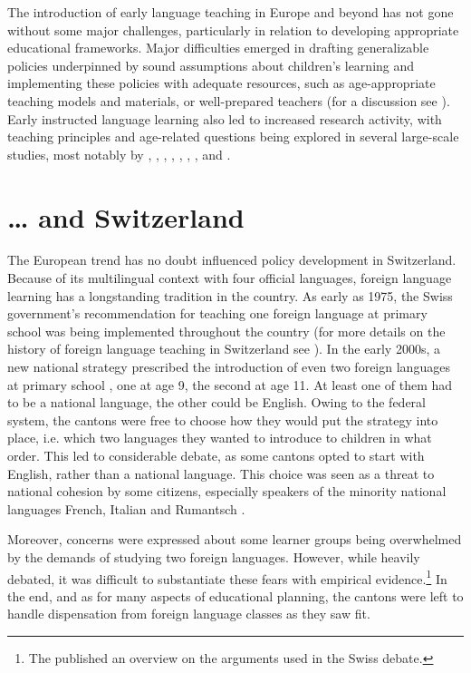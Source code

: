\documentclass[output=paper]{langsci/langscibook}
\begin{document}
The introduction of early language teaching in Europe and beyond has not gone without some major challenges, particularly in relation to developing appropriate educational frameworks. Major difficulties emerged in drafting generalizable policies underpinned by sound assumptions about children’s learning \citep{Johnstone2009} and implementing these policies with adequate resources, such as age-appropriate teaching models and materials, or well-prepared teachers (for a discussion see \citealt{GartonEtAl2011}). Early instructed language learning also led to increased research activity, with teaching principles and age-related questions being explored in several large-scale studies, most notably by \citet{EdelenbosEtAl2006}, \citet{Muñoz2006}, \citet{NikolovCsapó2010}, \citet{Enever2011}, \citet{GartonEtAl2011}, \citet{Pfenninger2016}, \citet{JaekelEtAl2017}, and \citet{BaumertEtAl2020}.

\section{… and Switzerland}

The European trend has no doubt influenced policy development in Switzerland. Because of its multilingual context with four official languages, foreign language learning has a longstanding tradition in the country. As early as 1975, the Swiss government’s recommendation for teaching one foreign language at primary school was being implemented throughout the country (for more details on the history of foreign language teaching in Switzerland see \citealt{GiudiciGrizelj2016}). In the early 2000s, a new national strategy prescribed the introduction of even two foreign languages at primary school \citep{EDK2004}, one at age 9, the second at age 11. At least one of them had to be a national language, the other could be English. Owing to the federal system, the cantons were free to choose how they would put the strategy into place, i.e. which two languages they wanted to introduce to children in what order. This led to considerable debate, as some cantons opted to start with English, rather than a national language. This choice was seen as a threat to national cohesion by some citizens, especially speakers of the minority national languages French, Italian and Rumantsch \citep{Stotz2006}.

Moreover, concerns were expressed about some learner groups being overwhelmed by the demands of studying two foreign languages. However, while heavily debated, it was difficult to substantiate these fears with empirical evidence.\footnote{The \citet{SchweizerischeAkademiederGeisteswissenschaften2015} published an overview on the arguments used in the Swiss debate.} In the end, and as for many aspects of educational planning, the cantons were left to handle dispensation from foreign language classes as they saw fit.
\end{document}
